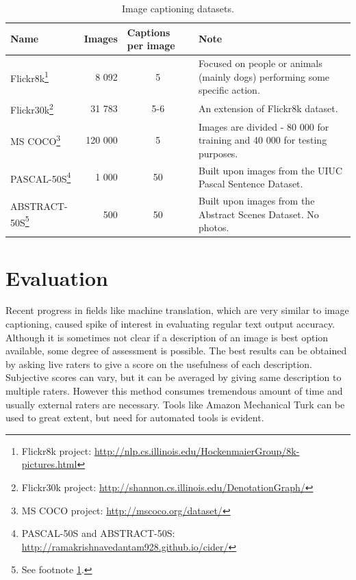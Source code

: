 \begin{center}
	\begin{longtable}{|l|m{2cm}|m{2cm}|m{4.7cm}|}			
		\caption{Image captioning datasets.} \label{tab:datasets} \\

	   	\hline
	   	\multicolumn{1}{|l|}{\textbf{Name}} & 
	   	\textbf{Images} & 
	   	\textbf{Captions per image} & 
	   	\textbf{Note} \\
	   	\hline \hline
		\endhead
		
	   	Flickr8k\footnote{Flickr8k project: \url{http://nlp.cs.illinois.edu/HockenmaierGroup/8k-pictures.html}} &
		   	\multicolumn{1}{r|}{8 092} &
		   	\multicolumn{1}{c|}{5} &
		   	Focused on people or animals (mainly dogs) performing some specific action. \\ \hline
	   	Flickr30k\footnote{Flickr30k project: \url{http://shannon.cs.illinois.edu/DenotationGraph/}} & 
		   	\multicolumn{1}{r|}{31 783} &
		   	\multicolumn{1}{c|}{5-6} &
		   	An extension of Flickr8k dataset. \\ \hline
	   	MS COCO\footnote{MS COCO project: \url{http://mscoco.org/dataset/}} &
		   	\multicolumn{1}{r|}{120 000} &
		   	\multicolumn{1}{c|}{5} &
		   	Images are divided - 80 000 for training and 40 000 for testing purposes. \\ \hline
	   	PASCAL-50S\footnote{\label{ft:cider}PASCAL-50S and ABSTRACT-50S: \url{http://ramakrishnavedantam928.github.io/cider/}} &
		   	\multicolumn{1}{r|}{1 000} &
		   	\multicolumn{1}{c|}{50} &
		   	Built upon images from the UIUC Pascal Sentence Dataset. \\ \hline
	   	ABSTRACT-50S\footnote{See footnote \ref{ft:cider}.} &
		   	\multicolumn{1}{r|}{500} &
		   	\multicolumn{1}{c|}{50} &
		   	Built upon images from the Abstract Scenes Dataset. No photos.\\ \hline
	\end{longtable}
\end{center}

	\section{Evaluation}
	\label{sec:evaluation}	
Recent progress in fields like machine translation, which are very similar to image captioning, caused spike of interest in evaluating regular text output accuracy. Although it is sometimes not clear if a description of an image is best option available, some degree of assessment is possible. The best results can be obtained by asking live raters to give a score on the usefulness of each description. Subjective scores can vary, but it can be averaged by giving same description to multiple raters. However this method consumes tremendous amount of time and usually external raters are necessary. Tools like Amazon Mechanical Turk can be used to great extent, but need for automated tools is evident.

